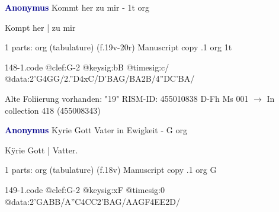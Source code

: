 \documentclass[twocolumn]{book}
\begin{document}
\newline \par \vspace{7pt} \textcolor{darkblue}{\textbf{Anonymus  }}
\newline Kommt her zu mir - 1t
\newline org
\newline \begin{itshape}[f.19v, at left:] Kompt her | zu mir\end{itshape} 
\newline \textcolor{darkblue}{}  1 parts: org (tabulature)  (f.19v-20r)
\newline Manuscript copy
.1  org  1t  
\begin{filecontents*}{148-1.code}
@clef:G-2
@keysig:bB
@timesig:c/
@data:2'G4GG/2.''D4xC/D'BAG/BA2B/4''DC'BA/
\end{filecontents*}
\newline
%

\newline Alte Foliierung vorhanden: "19"
\newline RISM-ID: 455010838
\newline D-Fh  Ms 001
\newline $\rightarrow$ In collection 418 (455008343)
      
\newline \par \vspace{7pt} \textcolor{darkblue}{\textbf{Anonymus  }}
\newline Kyrie Gott Vater in Ewigkeit - G
\newline org
\newline \begin{itshape}[f.18v, at left:] Kÿrie Gott | Vatter.\end{itshape} 
\newline \textcolor{darkblue}{}  1 parts: org (tabulature)  (f.18v)
\newline Manuscript copy
.1  org  G  
\begin{filecontents*}{149-1.code}
@clef:G-2
@keysig:xF
@timesig:0
@data:2'GABB/A''C4CC2'BAG/AAGF4EE2D/
\end{filecontents*}
\newline
%
\end{document}
